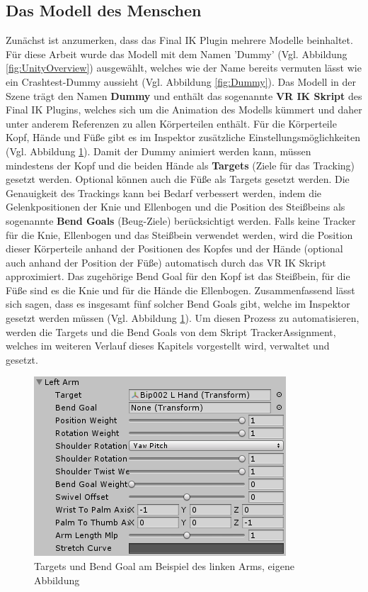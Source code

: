\subsection{Das Modell des Menschen}\label{sec:MMModell}
Zunächst ist anzumerken, dass das Final IK Plugin mehrere Modelle beinhaltet. Für diese Arbeit wurde das Modell mit dem Namen 'Dummy' (Vgl. Abbildung \ref{fig:UnityOverview}) ausgewählt, welches wie der Name bereits vermuten lässt wie ein Crashtest-Dummy aussieht (Vgl. Abbildung \ref{fig:Dummy}).
\newline\newline
Das Modell in der Szene trägt den Namen \textbf{Dummy} und enthält das sogenannte \textbf{VR IK Skript} des Final IK Plugins, welches sich um die Animation des Modells kümmert und daher unter anderem Referenzen zu allen Körperteilen enthält. Für die Körperteile Kopf, Hände und Füße gibt es im Inspektor zusätzliche Einstellungsmöglichkeiten (Vgl. Abbildung \ref{fig:TargetBendGoal}). Damit der Dummy animiert werden kann, müssen mindestens der Kopf und die beiden Hände als \textbf{Targets} (Ziele für das Tracking) gesetzt werden. Optional können auch die Füße als Targets gesetzt werden. 
Die Genauigkeit des Trackings kann bei Bedarf verbessert werden, indem die Gelenkpositionen der Knie und Ellenbogen und die Position des Steißbeins als sogenannte \textbf{Bend Goals} (Beug-Ziele) berücksichtigt werden. Falls keine Tracker für die Knie, Ellenbogen und das Steißbein verwendet werden, wird die Position dieser Körperteile anhand der Positionen des Kopfes und der Hände (optional auch anhand der Position der Füße) automatisch durch das VR IK Skript approximiert.
Das zugehörige Bend Goal für den Kopf ist das Steißbein, für die Füße sind es die Knie und für die Hände die Ellenbogen. Zusammenfassend lässt sich sagen, dass es insgesamt fünf solcher Bend Goals gibt, welche im Inspektor gesetzt werden müssen (Vgl. Abbildung \ref{fig:TargetBendGoal}).
Um diesen Prozess zu automatisieren, werden die Targets und die Bend Goals von dem Skript TrackerAssignment, welches im weiteren Verlauf dieses Kapitels vorgestellt wird, verwaltet und gesetzt.
\begin{figure}[h]
	\centering
	\includegraphics[width=0.35\linewidth]{Bilder/A36_TargetsBendGoals}
	\caption{Targets und Bend Goal am Beispiel des linken Arms, eigene Abbildung}
	\label{fig:TargetBendGoal}
\end{figure}
